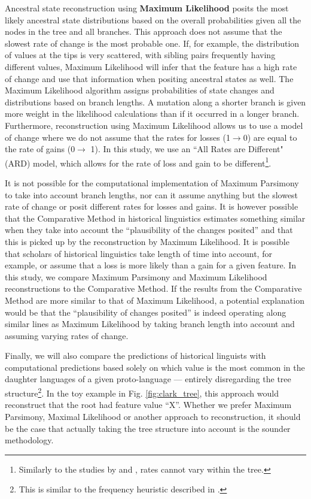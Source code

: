 \documentclass[a4paper,10pt]{article} %
\begin{document}
Ancestral state reconstruction using \textbf{Maximum Likelihood} posits the most likely ancestral state distributions based on the overall probabilities given all the nodes in the tree and all branches. This approach does not assume that the slowest rate of change is the most probable one. If, for example, the distribution of values at the tips is very scattered, with sibling pairs frequently having different values, Maximum Likelihood will infer that the feature has a high rate of change and use that information when positing ancestral states as well. The Maximum Likelihood algorithm assigns probabilities of state changes and distributions based on branch lengths. A mutation along a shorter branch is given more weight in the likelihood calculations than if it occurred in a longer branch. Furthermore, reconstruction using Maximum Likelihood allows us to use a model of change where we do not assume that the rates for losses (1$\rightarrow$0) are equal to the rate of gains (0$\rightarrow$ 1). In this study, we use an ``All Rates are Different" (ARD) model, which allows for the rate of loss and gain to be different\footnote{
Similarly to the studies by \citet{carling2021reconstructing} and \citet{goldstein_2022}, rates cannot vary within the tree.}. 

It is not possible for the computational implementation of Maximum Parsimony to take into account branch lengths, nor can it assume anything but the slowest rate of change or posit different rates for losses and gains. It is however possible that the Comparative Method in historical linguistics estimates something similar when they take into account the ``plausibility of the changes posited'' and that this is picked up by the reconstruction by Maximum Likelihood. It is possible that scholars of historical linguistics take length of time into account, for example, or assume that a loss is more likely than a gain for a given feature. In this study, we compare Maximum Parsimony and Maximum Likelihood reconstructions to the Comparative Method. If the results from the Comparative Method are more similar to that of Maximum Likelihood, a potential explanation would be that the ``plausibility of changes posited'' is indeed operating along similar lines as Maximum Likelihood by taking branch length into account and assuming varying rates of change.

Finally, we will also compare the predictions of historical linguists with computational predictions based solely on which value is the most common in the daughter languages of a given proto-language --- entirely disregarding the tree structure\footnote{This is similar to the frequency heuristic described in \citet{goldstein_2022}.}. In the toy example in Fig. \ref{fig:clark_tree}, this approach would reconstruct that the root had feature value ``X''. Whether we prefer Maximum Parsimony, Maximal Likelihood or another approach to reconstruction, it should be the case that actually taking the tree structure into account is the sounder methodology. %
\end{document}
